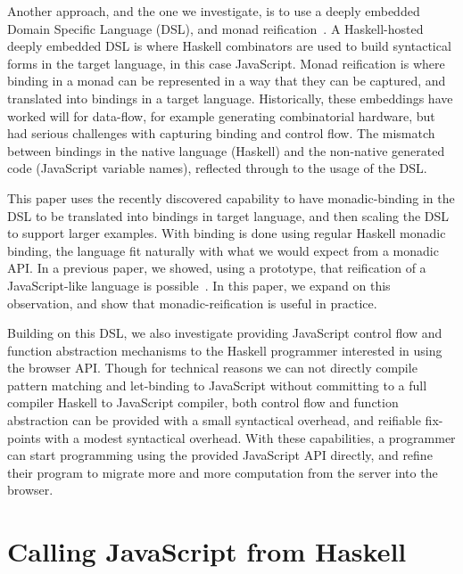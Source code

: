 \documentclass{llncs}
\begin{document}
Another approach, and the one we investigate,
is to use a deeply embedded Domain Specific Language (DSL), and
monad reification~\cite{..,..}.
A Haskell-hosted deeply embedded DSL is where Haskell combinators 
are used to build syntactical forms in the target language,
in this case JavaScript.
Monad reification is where binding in a monad can be represented
in a way that they can be captured, and translated into bindings
in a target language.
Historically, these embeddings have worked will for 
data-flow, for example generating combinatorial hardware,
but had serious challenges with capturing binding and control flow.
The mismatch between bindings in the native language (Haskell) 
and the non-native generated code (JavaScript variable names),
reflected through to the usage of the DSL.

This paper uses the recently discovered capability to have monadic-binding
in the DSL to be translated into
bindings in target language, and then scaling the DSL to support larger examples.
With binding is done using regular Haskell monadic binding, 
the language fit naturally with what we would expect from a monadic API. 
In a previous paper, we showed, using a prototype,
that reification of a JavaScript-like language is possible~\cite{Farmer:12:WebDSLs}.
In this paper, we expand on this observation,
and show that monadic-reification is useful in practice.

Building on this DSL, we also investigate providing
JavaScript control flow and function abstraction mechanisms
to the Haskell programmer interested in using the browser API.
Though for technical reasons we can not directly compile
pattern matching and let-binding to JavaScript without committing
to a full compiler Haskell to JavaScript compiler, both
control flow and function abstraction can be provided
with a small syntactical overhead, and reifiable fix-points 
with a modest syntactical overhead.
With these capabilities, a programmer can start programming
using the provided JavaScript API directly, and refine
their program to migrate more and more computation
from the server into the browser. 


\section{Calling JavaScript from Haskell}
\label{sec:js-rpc}
\end{document}
